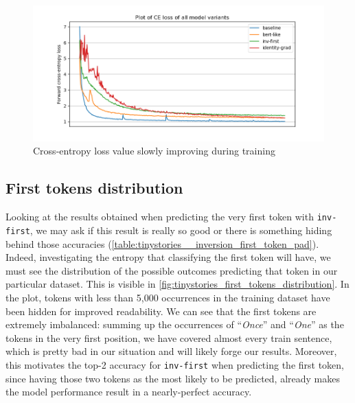 \documentclass[../thesis.tex]{subfiles}
\begin{document}
\begin{figure}[htbp]
    \centering
    \includegraphics[width=\linewidth]{assets/inverse-lm/inverse_lm_variants_ce_loss.png}
    \caption{Cross-entropy loss value slowly improving during training}
    \label{fig:inverse_lm_variants_ce_loss}
\end{figure}


\subsection{First tokens distribution}
Looking at the results obtained when predicting the very first token with \texttt{inv-first}, we may ask if this result is really so good or there is something hiding behind those accuracies (\cref{table:tinystories__inversion_first_token_pad}).
Indeed, investigating the entropy that classifying the first token will have, we must see the distribution of the possible outcomes predicting that token in our particular dataset. This is visible in \cref{fig:tinystories_first_tokens_distribution}.
In the plot, tokens with less than 5,000 occurrences in the training dataset have been hidden for improved readability.
We can see that the first tokens are extremely imbalanced: summing up the occurrences of ``\emph{Once}'' and ``\emph{One}'' as the tokens in the very first position, we have covered almost every train sentence, which is pretty bad in our situation and will likely forge our results. Moreover, this motivates the top-2 accuracy for \texttt{inv-first} when predicting the first token, since having those two tokens as the most likely to be predicted, already makes the model performance result in a nearly-perfect accuracy.
\end{document}
